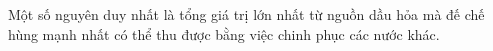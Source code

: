 Một số nguyên duy nhất là tổng giá trị lớn nhất từ nguồn dầu hỏa mà đế chế hùng mạnh nhất có thể thu được bằng việc chinh phục các nước khác.

\
